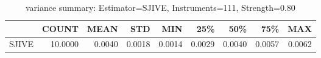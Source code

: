 \begin{table}[ht]
\centering
\caption{variance summary: Estimator=SJIVE, Instruments=111, Strength=0.80}
\begin{tabular}{lrrrrrrrr}
\toprule
 & COUNT & MEAN & STD & MIN & 25\% & 50\% & 75\% & MAX \\
\midrule
SJIVE & 10.0000 & 0.0040 & 0.0018 & 0.0014 & 0.0029 & 0.0040 & 0.0057 & 0.0062 \\
\bottomrule
\end{tabular}
\end{table}
